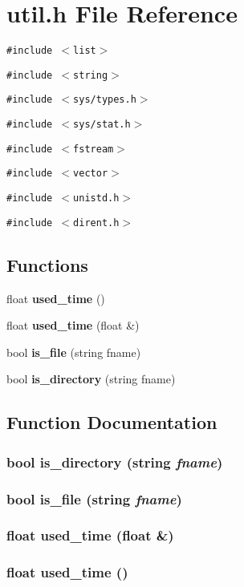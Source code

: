 \section{util.h File Reference}
\label{util_8h}
{\tt \#include $<$list$>$}\par
{\tt \#include $<$string$>$}\par
{\tt \#include $<$sys/types.h$>$}\par
{\tt \#include $<$sys/stat.h$>$}\par
{\tt \#include $<$fstream$>$}\par
{\tt \#include $<$vector$>$}\par
{\tt \#include $<$unistd.h$>$}\par
{\tt \#include $<$dirent.h$>$}\par
\subsection*{Functions}
\begin{CompactItemize}
\item 
float {\bf used\_\-time} ()
\item 
float {\bf used\_\-time} (float \&)
\item 
bool {\bf is\_\-file} (string fname)
\item 
bool {\bf is\_\-directory} (string fname)
\end{CompactItemize}


\subsection{Function Documentation}
\subsubsection{\setlength{\rightskip}{0pt plus 5cm}bool is\_\-directory (string {\em fname})}\label{util_8h_a3}


\subsubsection{\setlength{\rightskip}{0pt plus 5cm}bool is\_\-file (string {\em fname})}\label{util_8h_a2}


\subsubsection{\setlength{\rightskip}{0pt plus 5cm}float used\_\-time (float \&)}\label{util_8h_a1}


\subsubsection{\setlength{\rightskip}{0pt plus 5cm}float used\_\-time ()}\label{util_8h_a0}


